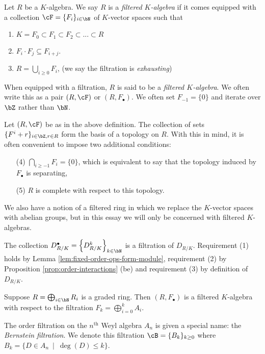 \begin{defn}\label{defn:filtered-ring}
	Let $R$ be a $K$-algebra. We say $R$ is a \emph{filtered $K$-algebra} if it comes equipped with a collection $\cF = \{F_i\}_{i \in \bN}$ of $K$-vector spaces such that
	\begin{enumerate}[(1)]
		\item $K = F_0 \subset F_1 \subset F_2 \subset...\subset R$
		\item $F_i\cdot F_j \subseteq F_{i+j}$.
		\item $R = \bigcup_{i\geq 0} F_i$, (we say the filtration is \emph{exhausting})
	\end{enumerate}
	When equipped with a filtration, $R$ is said to be a \emph{filtered $K$-algebra}. We often write this as a pair $(R,\cF)$ or $(R,F_\bullet)$. We often set $F_{-1} = \{0\}$ and iterate over $\bZ$ rather than $\bN$.
\end{defn}
\begin{rmk}\label{rmk:filtration-def-extension}
	Let $(R,\cF)$ be as in the above definition. The collection of sets $\{F^i + r\}_{i \in \bZ, r\in R}$ form the basis of a topology on $R$. With this in mind, it is often convenient to impose two additional conditions:
	\begin{enumerate}[(1)]
		\item[(4)] $\bigcap_{i\geq -1}F_i = \{0\}$, which is equivalent to say that the topology induced by $F_\bullet$ is separating,
		\item[(5)] $R$ is complete with respect to this topology.
	\end{enumerate}
\end{rmk}
We also have a notion of a filtered ring in which we replace the $K$-vector spaces with abelian groups, but in this essay we will only be concerned with filtered $K$-algebras.
\begin{example}\label{example:order-filtration}
	The collection $D^\bullet_{R/K} = \left\{D^k_{R/K}\right\}_{k\in \bN}$ is a filtration of $D_{R/K}$. Requirement (1) holds by Lemma \ref{lem:fixed-order-ops-form-module}, requirement (2) by Proposition \ref{prop:order-interactions} (be) and requirement (3) by definition of $D_{R/K}$. 
\end{example}
\begin{example}\label{example:graded-algebras-are-filtered}
	Suppose $R = \bigoplus_{i \in \bN} R_i$ is a graded ring. Then $(R,F_\bullet)$ is a filtered $K$-algebra with respect to the filtration $F_k = \bigoplus_{i=0}^k A_i$. 

	The order filtration on the $n^{\text{th}}$ Weyl algebra $A_n$ is given a special name: the \emph{Bernstein filtration}. We denote this filtration $\cB = \{B_k\}_{k\geq 0}$ where $B_k = \{D \in A_n ~\mid~ \deg(D) \leq k\}$.
\end{example}
